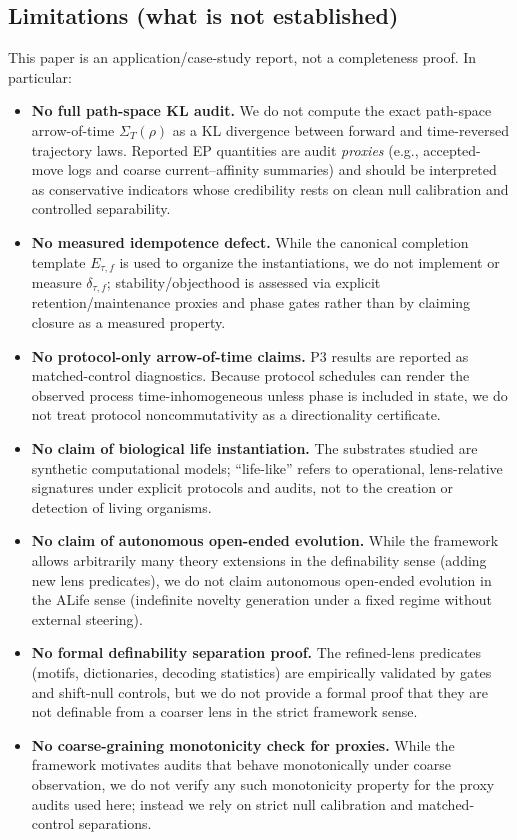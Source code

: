 \documentclass[11pt]{article}
\newcommand{\Sig}{\Sigma}
\begin{document}
\subsection{Limitations (what is not established)}\label{sec:discussion:limits}
This paper is an application/case-study report, not a completeness proof. In particular:
\begin{itemize}[leftmargin=*]
\item \textbf{No full path-space KL audit.} We do not compute the exact path-space arrow-of-time $\Sig_T(\rho)$ as a KL divergence between forward and time-reversed trajectory laws. Reported EP quantities are audit \emph{proxies} (e.g., accepted-move logs and coarse current--affinity summaries) and should be interpreted as conservative indicators whose credibility rests on clean null calibration and controlled separability.
\item \textbf{No measured idempotence defect.} While the canonical completion template $E_{\tau,f}$ is used to organize the instantiations, we do not implement or measure $\delta_{\tau,f}$; stability/objecthood is assessed via explicit retention/maintenance proxies and phase gates rather than by claiming closure as a measured property.
\item \textbf{No protocol-only arrow-of-time claims.} P3 results are reported as matched-control diagnostics. Because protocol schedules can render the observed process time-inhomogeneous unless phase is included in state, we do not treat protocol noncommutativity as a directionality certificate.
\item \textbf{No claim of biological life instantiation.} The substrates studied are synthetic computational models; ``life-like'' refers to operational, lens-relative signatures under explicit protocols and audits, not to the creation or detection of living organisms.
\item \textbf{No claim of autonomous open-ended evolution.} While the framework allows arbitrarily many theory extensions in the definability sense (adding new lens predicates), we do not claim autonomous open-ended evolution in the ALife sense (indefinite novelty generation under a fixed regime without external steering).
\item \textbf{No formal definability separation proof.} The refined-lens predicates (motifs, dictionaries, decoding statistics) are empirically validated by gates and shift-null controls, but we do not provide a formal proof that they are not definable from a coarser lens in the strict framework sense.
\item \textbf{No coarse-graining monotonicity check for proxies.} While the framework motivates audits that behave monotonically under coarse observation, we do not verify any such monotonicity property for the proxy audits used here; instead we rely on strict null calibration and matched-control separations.
\end{itemize}
\end{document}
